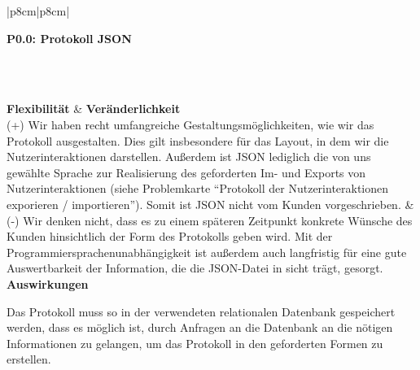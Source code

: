 \documentclass[enabledeprecatedfontcommands,fontsize=11pt,paper=a4,twoside]{scrartcl}
\newcounter{one}
\newcounter{two}[one]
\newcommand{\tone}{0\theone}
\newcommand{\two}{\stepcounter{two}0\thetwo}
\begin{document}
\begin{tabular} {|p{8cm}|p{8cm}|}
	\hline
	 {\parbox{16cm}{\textbf{\hypertarget{mm}{P\tone.\two}: Protokoll JSON}} } \\  \hline\hline 
	\rule{0pt}{4ex}\\ [1ex] \hline
	\textbf{Flexibilität}  & \textbf{Veränderlichkeit} \\
	(+) Wir haben recht umfangreiche Gestaltungsmöglichkeiten, wie wir das Protokoll ausgestalten. Dies gilt insbesondere für das Layout, in dem wir die Nutzerinteraktionen darstellen. Außerdem ist JSON lediglich die von uns gewählte Sprache zur Realisierung des geforderten Im- und Exports von Nutzerinteraktionen (siehe Problemkarte ``Protokoll der Nutzerinteraktionen exporieren / importieren''). Somit ist JSON nicht vom Kunden vorgeschrieben. &
	(-) Wir denken nicht, dass es zu einem späteren Zeitpunkt konkrete Wünsche des Kunden hinsichtlich der Form des Protokolls geben wird. Mit der Programmiersprachenunabhängigkeit ist außerdem auch langfristig für eine gute Auswertbarkeit der Information, die die JSON-Datei in sicht trägt, gesorgt. \\
	\hline
	 {\textbf{Auswirkungen}} \\
	 {\parbox{16cm}{Das Protokoll muss so in der verwendeten relationalen Datenbank gespeichert werden, dass es möglich ist, durch Anfragen an die Datenbank an die nötigen Informationen zu gelangen, um das Protokoll in den geforderten Formen zu erstellen.}}\\ \hline
\end{tabular}
\\ \\ \\ \\ %
\newpage
\end{document}
